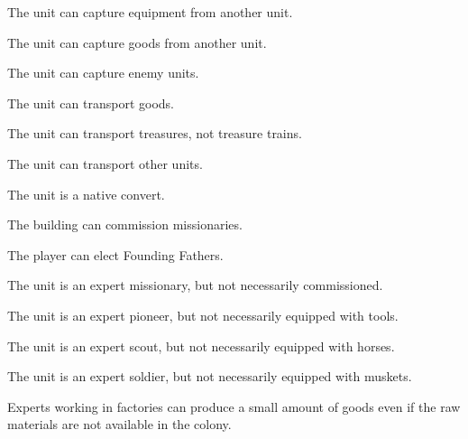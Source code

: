 \documentclass[12pt]{book}
\begin{document}
The unit can capture equipment from another unit.

\affectsUnit

The unit can capture goods from another unit.

\affectsUnit

The unit can capture enemy units.

\affectsUnit

The unit can transport goods.

\affectsUnit

The unit can transport treasures, not treasure trains.

\affectsUnit

The unit can transport other units.

\affectsUnit

The unit is a native convert.

\affectsBuilding

The building can commission missionaries.

\affectsPlayer

The player can elect Founding Fathers.

\affectsUnit

The unit is an expert missionary, but not necessarily commissioned.

\affectsUnit

The unit is an expert pioneer, but not necessarily equipped with tools.

\affectsUnit

The unit is an expert scout, but not necessarily equipped with horses.

\affectsUnit

The unit is an expert soldier, but not necessarily equipped with muskets.

\affectsPlayer

Experts working in factories can produce a small amount of goods even
if the raw materials are not available in the colony.

\affectsBuilding
\end{document}

